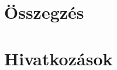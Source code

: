 \documentclass[12pt,a4paper]{book}
\begin{document}
\chapter{Összegzés}


\chapter{Hivatkozások}

\end{document}
